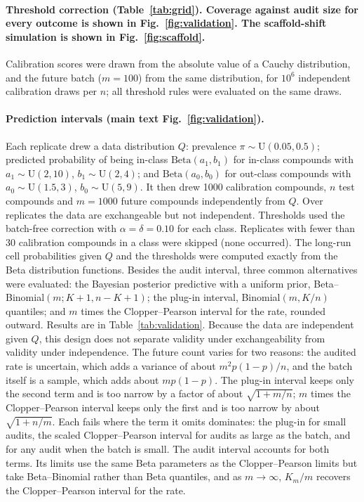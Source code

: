 \documentclass[10pt]{article}
\begin{document}
\paragraph{Threshold correction (Table~\ref{tab:grid}). Coverage against audit size for every outcome is shown in Fig.~\ref{fig:validation}. The scaffold-shift simulation is shown in Fig.~\ref{fig:scaffold}.} Calibration scores were drawn from the absolute value of a Cauchy distribution, and the future batch ($m=100$) from the same distribution, for $10^6$ independent calibration draws per $n$; all threshold rules were evaluated on the same draws.

\paragraph{Prediction intervals (main text Fig.~\ref{fig:validation}).} Each replicate drew a data distribution $Q$: prevalence $\pi\sim\mathrm{U}(0.05,0.5)$; predicted probability of being in-class $\mathrm{Beta}(a_1,b_1)$ for in-class compounds with $a_1\sim\mathrm U(2,10)$, $b_1\sim\mathrm U(2,4)$; and $\mathrm{Beta}(a_0,b_0)$ for out-class compounds with $a_0\sim\mathrm U(1.5,3)$, $b_0\sim\mathrm U(5,9)$. It then drew 1000 calibration compounds, $n$ test compounds and $m=1000$ future compounds independently from $Q$. Over replicates the data are exchangeable but not independent. Thresholds used the batch-free correction with $\alpha=\delta=0.10$ for each class. Replicates with fewer than 30 calibration compounds in a class were skipped (none occurred). The long-run cell probabilities given $Q$ and the thresholds were computed exactly from the Beta distribution functions. Besides the audit interval, three common alternatives were evaluated: the Bayesian posterior predictive with a uniform prior, Beta--Binomial$(m;K+1,n-K+1)$; the plug-in interval, Binomial$(m,K/n)$ quantiles; and $m$ times the Clopper--Pearson interval for the rate, rounded outward. Results are in Table~\ref{tab:validation}. Because the data are independent given $Q$, this design does not separate validity under exchangeability from validity under independence. The future count varies for two reasons: the audited rate is uncertain, which adds a variance of about $m^2p(1-p)/n$, and the batch itself is a sample, which adds about $mp(1-p)$. The plug-in interval keeps only the second term and is too narrow by a factor of about $\sqrt{1+m/n}$; $m$ times the Clopper--Pearson interval keeps only the first and is too narrow by about $\sqrt{1+n/m}$. Each fails where the term it omits dominates: the plug-in for small audits, the scaled Clopper--Pearson interval for audits as large as the batch, and for any audit when the batch is small. The audit interval accounts for both terms. Its limits use the same Beta parameters as the Clopper--Pearson limits but take Beta--Binomial rather than Beta quantiles, and as $m\to\infty$, $K_m/m$ recovers the Clopper--Pearson interval for the rate.
\end{document}
